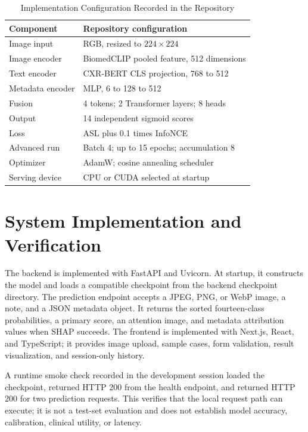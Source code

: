 \documentclass[conference]{IEEEtran}
\begin{document}
\begin{table}[t]
\caption{Implementation Configuration Recorded in the Repository}
\label{tab:config}
\centering
\scriptsize
\begin{tabular}{p{}p{}}
\toprule
Component & Repository configuration \\
\midrule
Image input & RGB, resized to $224\times224$ \\
Image encoder & BiomedCLIP pooled feature, 512 dimensions \\
Text encoder & CXR-BERT CLS projection, 768 to 512 \\
Metadata encoder & MLP, 6 to 128 to 512 \\
Fusion & 4 tokens; 2 Transformer layers; 8 heads \\
Output & 14 independent sigmoid scores \\
Loss & ASL plus 0.1 times InfoNCE \\
Advanced run & Batch 4; up to 15 epochs; accumulation 8 \\
Optimizer & AdamW; cosine annealing scheduler \\
Serving device & CPU or CUDA selected at startup \\
\bottomrule
\end{tabular}
\end{table}

\section{System Implementation and Verification}
The backend is implemented with FastAPI and Uvicorn. At startup, it constructs the model and loads a compatible checkpoint from the backend checkpoint directory. The prediction endpoint accepts a JPEG, PNG, or WebP image, a note, and a JSON metadata object. It returns the sorted fourteen-class probabilities, a primary score, an attention image, and metadata attribution values when SHAP succeeds. The frontend is implemented with Next.js, React, and TypeScript; it provides image upload, sample cases, form validation, result visualization, and session-only history.

A runtime smoke check recorded in the development session loaded the checkpoint, returned HTTP 200 from the health endpoint, and returned HTTP 200 for two prediction requests. This verifies that the local request path can execute; it is not a test-set evaluation and does not establish model accuracy, calibration, clinical utility, or latency.
\end{document}
